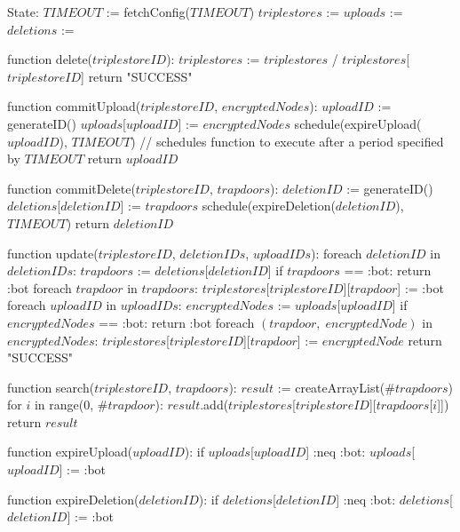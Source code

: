 State:
    $TIMEOUT$ := fetchConfig($TIMEOUT$)
    $triplestores$ := {}
    $uploads$ := {}
    $deletions$ := {}
    
function delete($triplestoreID$):
    $triplestores$ := $triplestores$ / { $triplestores$[$triplestoreID$] }
    return "SUCCESS"

function commitUpload($triplestoreID$, $encryptedNodes$):
    $uploadID$ := generateID()
    $uploads$[$uploadID$] := $encryptedNodes$
    schedule(expireUpload($uploadID$), $TIMEOUT$) // schedules function to execute after a period specified by $TIMEOUT$
    return $uploadID$

function commitDelete($triplestoreID$, $trapdoors$):
    $deletionID$ := generateID()
    $deletions$[$deletionID$] := $trapdoors$
    schedule(expireDeletion($deletionID$), $TIMEOUT$)
    return $deletionID$

function update($triplestoreID$, $deletionIDs$, $uploadIDs$):
    foreach $deletionID$ in $deletionIDs$:
        $trapdoors$ := $deletions$[$deletionID$]
        if $trapdoors$ == :bot:
            return :bot
        foreach $trapdoor$ in $trapdoors$:
            $triplestores$[$triplestoreID$][$trapdoor$] := :bot
    foreach $uploadID$ in $uploadIDs$:
        $encryptedNodes$ := $uploads$[$uploadID$]
        if $encryptedNodes$ == :bot:
            return :bot
        foreach $(trapdoor, \; encryptedNode)$ in $encryptedNodes$:
            $triplestores$[$triplestoreID$][$trapdoor$] := $encryptedNode$ 
    return "SUCCESS"

function search($triplestoreID$, $trapdoors$):
    $result$ := createArrayList($\#trapdoors$)
    for $i$ in range(0, $\#trapdoor$):
        $result$.add($triplestores$[$triplestoreID$][$trapdoors$[$i$]])
    return $result$

function expireUpload($uploadID$):
    if $uploads$[$uploadID$] :neq :bot:
        $uploads$[$uploadID$] := :bot

function expireDeletion($deletionID$):
    if $deletions$[$deletionID$] :neq :bot:
        $deletions$[$deletionID$] := :bot